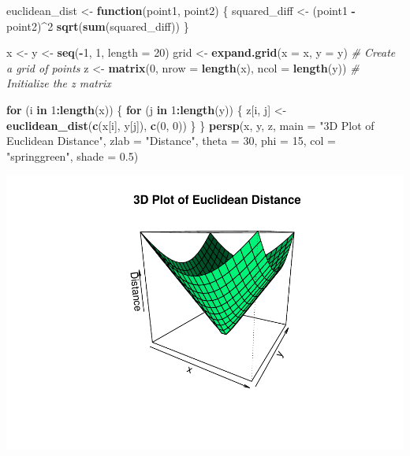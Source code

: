 \documentclass[
]{article}
\newenvironment{Shaded}{\begin{snugshade}}{\end{snugshade}}
\newcommand{\AttributeTok}[1]{\textcolor[rgb]{0.13,0.29,0.53}{#1}}
\newcommand{\CommentTok}[1]{\textcolor[rgb]{0.56,0.35,0.01}{\textit{#1}}}
\newcommand{\ControlFlowTok}[1]{\textcolor[rgb]{0.13,0.29,0.53}{\textbf{#1}}}
\newcommand{\DecValTok}[1]{\textcolor[rgb]{0.00,0.00,0.81}{#1}}
\newcommand{\FloatTok}[1]{\textcolor[rgb]{0.00,0.00,0.81}{#1}}
\newcommand{\FunctionTok}[1]{\textcolor[rgb]{0.13,0.29,0.53}{\textbf{#1}}}
\newcommand{\NormalTok}[1]{#1}
\newcommand{\OtherTok}[1]{\textcolor[rgb]{0.56,0.35,0.01}{#1}}
\newcommand{\SpecialCharTok}[1]{\textcolor[rgb]{0.81,0.36,0.00}{\textbf{#1}}}
\newcommand{\StringTok}[1]{\textcolor[rgb]{0.31,0.60,0.02}{#1}}
\begin{document}
\begin{Shaded}
\begin{Highlighting}[]
\NormalTok{euclidean\_dist }\OtherTok{\textless{}{-}} \ControlFlowTok{function}\NormalTok{(point1, point2) \{}
\NormalTok{  squared\_diff }\OtherTok{\textless{}{-}}\NormalTok{ (point1 }\SpecialCharTok{{-}}\NormalTok{ point2)}\SpecialCharTok{\^{}}\DecValTok{2}
  \FunctionTok{sqrt}\NormalTok{(}\FunctionTok{sum}\NormalTok{(squared\_diff))}
\NormalTok{\}}

\NormalTok{x }\OtherTok{\textless{}{-}}\NormalTok{ y }\OtherTok{\textless{}{-}} \FunctionTok{seq}\NormalTok{(}\SpecialCharTok{{-}}\DecValTok{1}\NormalTok{, }\DecValTok{1}\NormalTok{, }\AttributeTok{length =} \DecValTok{20}\NormalTok{)}
\NormalTok{grid }\OtherTok{\textless{}{-}} \FunctionTok{expand.grid}\NormalTok{(}\AttributeTok{x =}\NormalTok{ x, }\AttributeTok{y =}\NormalTok{ y)  }\CommentTok{\# Create a grid of points}
\NormalTok{z }\OtherTok{\textless{}{-}} \FunctionTok{matrix}\NormalTok{(}\DecValTok{0}\NormalTok{, }\AttributeTok{nrow =} \FunctionTok{length}\NormalTok{(x), }\AttributeTok{ncol =} \FunctionTok{length}\NormalTok{(y))  }\CommentTok{\# Initialize the z matrix}

\ControlFlowTok{for}\NormalTok{ (i }\ControlFlowTok{in} \DecValTok{1}\SpecialCharTok{:}\FunctionTok{length}\NormalTok{(x)) \{}
  \ControlFlowTok{for}\NormalTok{ (j }\ControlFlowTok{in} \DecValTok{1}\SpecialCharTok{:}\FunctionTok{length}\NormalTok{(y)) \{}
\NormalTok{    z[i, j] }\OtherTok{\textless{}{-}} \FunctionTok{euclidean\_dist}\NormalTok{(}\FunctionTok{c}\NormalTok{(x[i], y[j]), }\FunctionTok{c}\NormalTok{(}\DecValTok{0}\NormalTok{, }\DecValTok{0}\NormalTok{))}
\NormalTok{  \}}
\NormalTok{\}}
\FunctionTok{persp}\NormalTok{(x, y, z,}
      \AttributeTok{main =} \StringTok{"3D Plot of Euclidean Distance"}\NormalTok{,}
      \AttributeTok{zlab =} \StringTok{"Distance"}\NormalTok{,}
      \AttributeTok{theta =} \DecValTok{30}\NormalTok{, }\AttributeTok{phi =} \DecValTok{15}\NormalTok{,}
      \AttributeTok{col =} \StringTok{"springgreen"}\NormalTok{, }\AttributeTok{shade =} \FloatTok{0.5}\NormalTok{)}
\end{Highlighting}
\end{Shaded}

\includegraphics{week1_files/figure-latex/unnamed-chunk-2-1.pdf}
\end{document}
